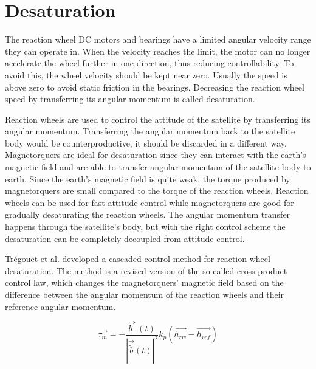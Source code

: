 \section{Desaturation}

The reaction wheel DC motors and bearings have a limited angular velocity range they can operate in. When the velocity reaches the limit, the motor can no longer accelerate the wheel further in one direction, thus reducing controllability. To avoid this, the wheel velocity should be kept near zero. Usually the speed is above zero to avoid static friction in the bearings. Decreasing the reaction wheel speed by transferring its angular momentum is called desaturation.

Reaction wheels are used to control the attitude of the satellite by transferring its angular momentum. Transferring the angular momentum back to the satellite body would be counterproductive, it should be discarded in a different way. Magnetorquers are ideal for desaturation since they can interact with the earth's magnetic field and are able to transfer angular momentum of the satellite body to earth. Since the earth's magnetic field is quite weak, the torque produced by magnetorquers are small compared to the torque of the reaction wheels. Reaction wheels can be used for fast attitude control while magnetorquers are good for gradually desaturating the reaction wheels. The angular momentum transfer happens through the satellite's body, but with the right control scheme the desaturation can be  completely decoupled from attitude control.

Trégouët et al. \cite{DesatTregouet} developed a cascaded control method for reaction wheel desaturation. The method is a revised version of the so-called cross-product control law, which changes the magnetorquers' magnetic field based on the difference between the angular momentum of the reaction wheels and their reference angular momentum.

\begin{equation}
\vec{\tau_m} = -\frac{\underline{\tilde{b}}^\times(t)}{|\vec{\tilde{b}}(t) |^2} k_p\left(\vec{h_{rw}} - \vec{h_{ref}} \right)
\end{equation}



